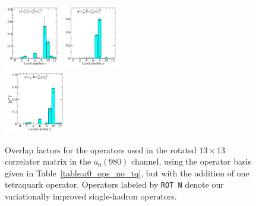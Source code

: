 \begin{figure}
  \includegraphics[width=0.22\textwidth]{figures/spectrum_a1gm/with_tq/zfactors/zfactor_isotriplet_eta_pion-A1gm_1-P011-A2p-SS_1-P0-1-1-A2m-SS_1.pdf}
  \includegraphics[width=0.22\textwidth]{figures/spectrum_a1gm/with_tq/zfactors/zfactor_isotriplet_kaon_kbar-A1gm_1-P011-A2-SS_0-P0-1-1-A2-SS_0.pdf}\\[-0.2cm]
  \includegraphics[width=0.24\textwidth]{figures/spectrum_a1gm/with_tq/zfactors/zfactor_isotriplet_kaon_kbar-A1gm_1-P011-A2-SS_1-P0-1-1-A2-SS_1.pdf}
  \cprotect\caption[Overlap factors for the operators used in the rotated $13\times 13$ correlator matrix in the $a_0(980)$ channel, using the operator basis given in Table~\ref{table:a0_ops_no_tq}, but with the addition of one tetraquark operator.]{Overlap factors for the operators used in the rotated $13\times 13$ correlator matrix in the $a_0(980)$ channel, using the operator basis given in Table~\ref{table:a0_ops_no_tq}, but with the addition of one tetraquark operator. Operators labeled by \verb+ROT N+ denote our variationally improved single-hadron operators.}
  \label{fig:a0_with_tq_zfactors}
\end{figure}

